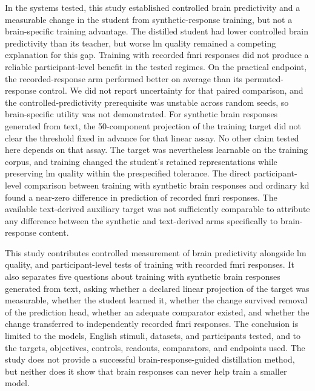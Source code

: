 In the systems tested, this study established controlled brain predictivity and a measurable change in the student from synthetic-response training, but not a brain-specific training advantage.
The distilled student had lower controlled brain predictivity than its teacher, but worse \ac{lm} quality remained a competing explanation for this gap.
Training with recorded \ac{fmri} responses did not produce a reliable participant-level benefit in the tested regimes.
On the practical endpoint, the recorded-response arm performed better on average than its permuted-response control.
We did not report uncertainty for that paired comparison, and the controlled-predictivity prerequisite was unstable across random seeds, so brain-specific utility was not demonstrated.
For synthetic brain responses generated from text, the 50-component projection of the training target did not clear the threshold fixed in advance for that linear assay.
No other claim tested here depends on that assay.
The target was nevertheless learnable on the training corpus, and training changed the student's retained representations while preserving \ac{lm} quality within the prespecified tolerance.
The direct participant-level comparison between training with synthetic brain responses and ordinary \ac{kd} found a near-zero difference in prediction of recorded \ac{fmri} responses.
The available text-derived auxiliary target was not sufficiently comparable to attribute any difference between the synthetic and text-derived arms specifically to brain-response content.

This study contributes controlled measurement of brain predictivity alongside \ac{lm} quality, and participant-level tests of training with recorded \ac{fmri} responses.
It also separates five questions about training with synthetic brain responses generated from text, asking whether a declared linear projection of the target was measurable, whether the student learned it, whether the change survived removal of the prediction head, whether an adequate comparator existed, and whether the change transferred to independently recorded \ac{fmri} responses.
The conclusion is limited to the models, English stimuli, datasets, and participants tested, and to the targets, objectives, controls, readouts, comparators, and endpoints used.
The study does not provide a successful brain-response-guided distillation method, but neither does it show that brain responses can never help train a smaller model.

